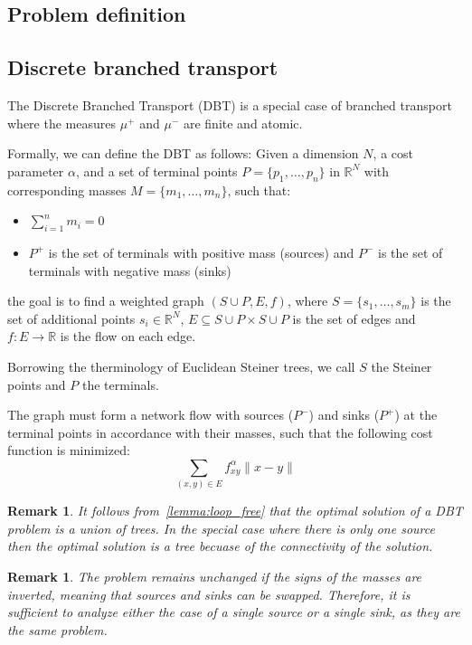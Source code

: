 \documentclass[12pt,a4paper]{article}
\numberwithin{equation}{section}
\theoremstyle{mytheorem}
\theoremstyle{myremark}
\newtheorem{remark}[subsection]{Remark}
\theoremstyle{myparagraph}
\newcommand{\R}{\mathbb{R}}
\begin{document}
    \subsection{Problem definition}



    \subsection{Discrete branched transport}
    \label{sec:DBT}

    The Discrete Branched Transport (DBT) is a special case of branched transport
    where the measures $\mu^+$ and $\mu^-$ are finite and atomic.

    Formally, we can define the DBT as follows: 
    Given a dimension $N$, a cost parameter $\alpha$, and a set of terminal points $P = \{p_1, \ldots, p_n\}$ in $\mathbb{R}^N$ with
    corresponding masses $M = \{m_1, \ldots, m_n\}$, such that:
    \begin{itemize}
        \item $\sum_{i=1}^{n} m_i = 0$
        \item $P^+$ is the set of terminals with positive mass (sources) and $P^-$ is the set of terminals with negative mass (sinks)
    \end{itemize}

    the goal is to find a weighted graph $(S \cup P, E, f)$, where $S = \{s_1, \ldots, s_m\}$
    is the set of additional points
    $s_i \in \R^N$, $E \subseteq S \cup P \times S \cup P$ is the set of edges and
    $f : E \rightarrow \mathbb{R}$ is the flow on each edge.

    Borrowing the therminology of Euclidean Steiner trees, we call $S$ the Steiner points and $P$ the terminals.

    The graph must form a network flow with sources ($P^-$) and sinks ($P^+$) at the terminal points in accordance with their masses,
    such that the following cost function is minimized:
    \[
        \sum_{(x,y) \in E} f_{xy}^\alpha \|x - y\|
    \]
    \begin{remark}
        It follows from~\ref{lemma:loop_free} that the optimal solution of a DBT problem is a union of trees.
        In the special case where there is only one source then the optimal solution is a tree becuase of the connectivity
        of the solution.
    \end{remark}
    \begin{remark}
        The problem remains unchanged if the signs of the masses are inverted, meaning that sources and sinks can be swapped.
        Therefore, it is sufficient to analyze either the case of a single source or a single sink, as they are the same problem.
    \end{remark}
\end{document}
